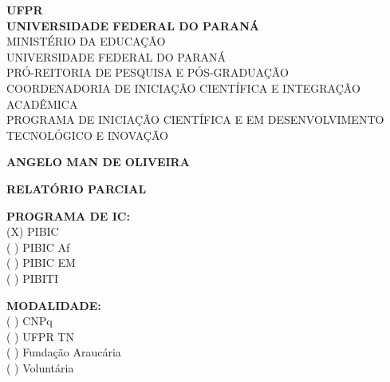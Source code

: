 \documentclass[11pt,a4paper]{article}
\begin{document}
\thispagestyle{empty}

\begin{center}
    \textbf{UFPR} \\
    \textbf{UNIVERSIDADE FEDERAL DO PARANÁ} \\
    \vspace{0.5cm}
    MINISTÉRIO DA EDUCAÇÃO \\
    UNIVERSIDADE FEDERAL DO PARANÁ \\
    PRÓ-REITORIA DE PESQUISA E PÓS-GRADUAÇÃO \\
    COORDENADORIA DE INICIAÇÃO CIENTÍFICA E INTEGRAÇÃO ACADÊMICA \\
    PROGRAMA DE INICIAÇÃO CIENTÍFICA E EM DESENVOLVIMENTO TECNOLÓGICO E INOVAÇÃO
    
    \vspace{3cm}
    
    \textbf{ANGELO MAN DE OLIVEIRA}
    
    \vspace{3cm}
    
    \textbf{RELATÓRIO PARCIAL}
    
    \vspace{1.5cm}
\end{center}

\noindent
\begin{minipage}[t]{0.48\textwidth}
    \textbf{PROGRAMA DE IC:}\\
    (X) PIBIC\\
    ( ) PIBIC Af\\
    ( ) PIBIC EM\\
    ( ) PIBITI
\end{minipage}%
\begin{minipage}[t]{0.48\textwidth}
    \textbf{MODALIDADE:}\\
    ( ) CNPq\\
    ( ) UFPR TN\\
    ( ) Fundação Araucária\\
    ( ) Voluntária
\end{minipage}

\vspace{2cm}
\end{document}
